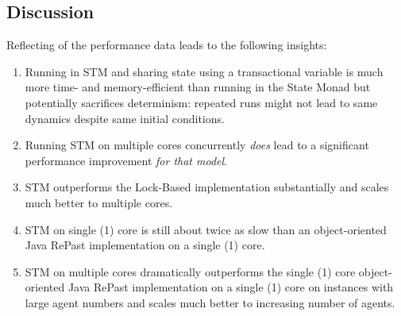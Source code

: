 \subsection{Discussion}
Reflecting of the performance data leads to the following insights:
\begin{enumerate}
	\item Running in STM and sharing state using a transactional variable is much more time- and memory-efficient than running in the State Monad but potentially sacrifices determinism: repeated runs might not lead to same dynamics despite same initial conditions.
	\item Running STM on multiple cores concurrently \textit{does} lead to a significant performance improvement \textit{for that model}.
	\item STM outperforms the Lock-Based implementation substantially and scales much better to multiple cores.
	\item STM on single (1) core is still about twice as slow than an object-oriented Java RePast implementation on a single (1) core.
	\item STM on multiple cores dramatically outperforms the single (1) core object-oriented Java RePast implementation on a single (1) core on instances with large agent numbers and scales much better to increasing number of agents.
\end{enumerate}